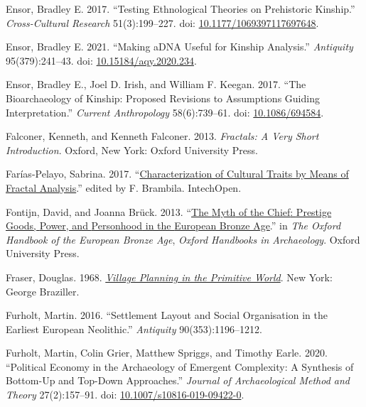 \documentclass[
  12pt,
]{book}
\newlength{\cslhangindent}
\newlength{\cslentryspacingunit} %
\newenvironment{CSLReferences}[2] %
 {%
  \setlength{\parindent}{0pt}
  \ifodd #1
  \let\oldpar\par
  \def\par{\hangindent=\cslhangindent\oldpar}
  \fi
  \setlength{\parskip}{#2\cslentryspacingunit}
 }%
 {}
\begin{document}
\begin{CSLReferences}{1}{0}
\leavevmode{}%
Ensor, Bradley E. 2017. {``Testing Ethnological Theories on Prehistoric Kinship.''} \emph{Cross-Cultural Research} 51(3):199--227. doi: \href{https://doi.org/10.1177/1069397117697648}{10.1177/1069397117697648}.

\leavevmode{}%
Ensor, Bradley E. 2021. {``Making aDNA Useful for Kinship Analysis.''} \emph{Antiquity} 95(379):241--43. doi: \href{https://doi.org/10.15184/aqy.2020.234}{10.15184/aqy.2020.234}.

\leavevmode{}%
Ensor, Bradley E., Joel D. Irish, and William F. Keegan. 2017. {``The Bioarchaeology of Kinship: Proposed Revisions to Assumptions Guiding Interpretation.''} \emph{Current Anthropology} 58(6):739--61. doi: \href{https://doi.org/10.1086/694584}{10.1086/694584}.

\leavevmode{}%
Falconer, Kenneth, and Kenneth Falconer. 2013. \emph{Fractals: A Very Short Introduction}. Oxford, New York: Oxford University Press.

\leavevmode{}%
Farías-Pelayo, Sabrina. 2017. {``\href{https://DOI:\%2010.5772/67893}{Characterization of Cultural Traits by Means of Fractal Analysis}.''} edited by F. Brambila. IntechOpen.

\leavevmode{}%
Fontijn, David, and Joanna Brück. 2013. {``\href{https://doi.org/10.1093/oxfordhb/9780199572861.013.0011}{The {Myth} of the {Chief}: {Prestige Goods}, {Power}, and {Personhood} in the {European Bronze Age}}.''} in \emph{The {Oxford Handbook} of the {European Bronze Age}}, \emph{Oxford {Handbooks} in {Archaeology}}. {Oxford University Press}.

\leavevmode{}%
Fraser, Douglas. 1968. \emph{\href{http://archive.org/details/VillagePlanningInThePrimitiveWorld}{Village Planning in the Primitive World}}. New York: George Braziller.

\leavevmode{}%
Furholt, Martin. 2016. {``Settlement Layout and Social Organisation in the Earliest European Neolithic.''} \emph{Antiquity} 90(353):1196--1212.

\leavevmode{}%
Furholt, Martin, Colin Grier, Matthew Spriggs, and Timothy Earle. 2020. {``Political Economy in the Archaeology of Emergent Complexity: A Synthesis of Bottom-Up and Top-Down Approaches.''} \emph{Journal of Archaeological Method and Theory} 27(2):157--91. doi: \href{https://doi.org/10.1007/s10816-019-09422-0}{10.1007/s10816-019-09422-0}.


\end{CSLReferences}
\end{document}
